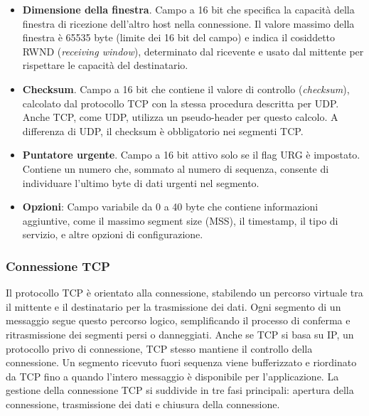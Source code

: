 \documentclass[12pt]{report}
\begin{document}
\begin{itemize}
		\item \textbf{Dimensione della finestra}. Campo a 16 bit che specifica la capacità della finestra di ricezione dell'altro host nella connessione. Il valore massimo della finestra è 65535 byte (limite dei 16 bit del campo) e indica il cosiddetto RWND (\textit{receiving window}), determinato dal ricevente e usato dal mittente per rispettare le capacità del destinatario.
	
		\item \textbf{Checksum}. Campo a 16 bit che contiene il valore di controllo (\textit{checksum}), calcolato dal protocollo TCP con la stessa procedura descritta per UDP. Anche TCP, come UDP, utilizza un pseudo-header per questo calcolo. A differenza di UDP, il checksum è obbligatorio nei segmenti TCP.
	
		\item \textbf{Puntatore urgente}. Campo a 16 bit attivo solo se il flag URG è impostato. Contiene un numero che, sommato al numero di sequenza, consente di individuare l'ultimo byte di dati urgenti nel segmento.
		
		\item \textbf{Opzioni}: Campo variabile da 0 a 40 byte che contiene informazioni aggiuntive, come il massimo segment size (MSS), il timestamp, il tipo di servizio, e altre opzioni di configurazione.
	\end{itemize}

	\subsubsection{Connessione TCP}
	Il protocollo TCP è orientato alla connessione, stabilendo un percorso virtuale tra il mittente e il destinatario per la trasmissione dei dati. Ogni segmento di un messaggio segue questo percorso logico, semplificando il processo di conferma e ritrasmissione dei segmenti persi o danneggiati. Anche se TCP si basa su IP, un protocollo privo di connessione, TCP stesso mantiene il controllo della connessione. Un segmento ricevuto fuori sequenza viene bufferizzato e riordinato da TCP fino a quando l'intero messaggio è disponibile per l'applicazione.
	La gestione della connessione TCP si suddivide in tre fasi principali: apertura della connessione, trasmissione dei dati e chiusura della connessione.
\end{document}
